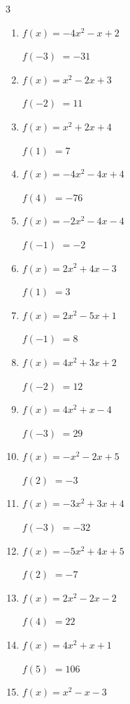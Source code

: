 \begin{multicols}{3}
\begin{enumerate}
$f(-4)$
        $= 49$

\columnbreak %

  \item $f(x)=-4x^{2}-x+2$

$f(-3)$
        $= -31$

  \item $f(x)=x^{2}-2x+3$

$f(-2)$
        $= 11$

  \item $f(x)=x^{2}+2x+4$

$f(1)$
        $= 7$

  \item $f(x)=-4x^{2}-4x+4$

$f(4)$
        $= -76$

  \item $f(x)=-2x^{2}-4x-4$

$f(-1)$
        $= -2$

  \item $f(x)=2x^{2}+4x-3$

$f(1)$
        $= 3$

  \item $f(x)=2x^{2}-5x+1$

$f(-1)$
        $= 8$

  \item $f(x)=4x^{2}+3x+2$

$f(-2)$
        $= 12$

  \item $f(x)=4x^{2}+x-4$

$f(-3)$
        $= 29$

  \item $f(x)=-x^{2}-2x+5$

$f(2)$
        $= -3$

  \item $f(x)=-3x^{2}+3x+4$

$f(-3)$
        $= -32$

  \item $f(x)=-5x^{2}+4x+5$

$f(2)$
        $= -7$

  \item $f(x)=2x^{2}-2x-2$

$f(4)$
        $= 22$

  \item $f(x)=4x^{2}+x+1$

$f(5)$
        $= 106$

  \item $f(x)=x^{2}-x-3$


\end{enumerate}
\end{multicols}
